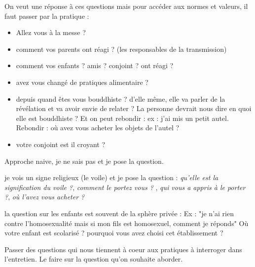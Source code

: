 On veut une réponse à ces questions mais pour accéder aux normes et valeurs, il faut passer par la pratique :
\begin{itemize}
\item Allez vous à la messe ?
\item comment vos parents ont réagi ? (les responsables de la transmission)
\item comment vos enfants ? amis ? conjoint ? ont réagi ?
\item avez vous changé de pratiques alimentaire ? 
\item depuis quand êtes vous bouddhiste ? d'elle même, elle va parler de la révélation et va avoir envie de relater ? La personne devrait nous dire en quoi elle est bouddhiste ? Et on peut rebondir : ex : j'ai mis un petit autel. Rebondir : où avez vous acheter les objets de l'autel ?
\item votre conjoint est il croyant ?

\end{itemize}

\begin{Def}
Approche naive, je ne sais pas et je pose la question.
\end{Def}

je vois un signe religieux (le voile) et je pose la question : \textit{qu'elle est la signification du voile ?}, \textit{comment le portez vous ? }, \textit{qui vous a appris à le porter ?}, \textit{où l'avez vous acheter ?}

\begin{Prop}
la question sur les enfants est souvent de la sphère privée : Ex : "je n'ai rien contre l'homosexualité mais si mon fils est homosexuel, comment je réponds"
Où votre enfant est scolarisé ? pourquoi vous avez choisi cet établissement ?

\end{Prop}

\begin{Exo}
Passer des questions qui nous tiennent à coeur aux pratiques à interroger dans l'entretien.
Le faire sur la question qu'on souhaite aborder.
\end{Exo}

